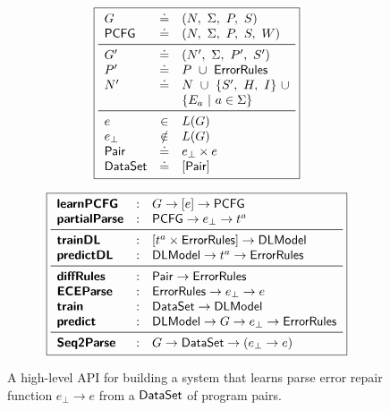 \begin{figure}[t]
\small
\begin{minipage}[t]{0.42\linewidth}
  \lstDeleteShortInline{|}
  \[
  \boxed{
  \begin{array}{lcl}
    G              & \defeq  & (N,\ \Sigma,\ P,\ S) \\
    \pcfgsym       & \defeq  & (N,\ \Sigma,\ P,\ S,\ W) \\
    \midrule
    G'             & \defeq  & (N',\ \Sigma,\ P',\ S') \\
    P'             & \defeq  & P\ \cup\ \errorrulessym \\
    N'             & \defeq  & N\ \cup\ \{S',\ H,\ I\}\ \cup\\
                   &         & \{E_a\ |\ a \in \Sigma\} \\
    \midrule
    e              & \in    & L(G) \\
    e_{\bot}       & \notin & L(G) \\
    \pairsym       & \defeq & e_{\bot} \times e \\
    \datasetsym    & \defeq & \List{\pairsym} \\
  \end{array}
  }
  \]
  \lstMakeShortInline[language=Python, mathescape=true]{|}
\end{minipage}
\begin{minipage}[t]{0.57\linewidth}
  \lstDeleteShortInline{|}
  \[
  \boxed{
  \begin{array}{lcl}
    \learnPCFGsym  & : & G \to \List{e} \to \pcfgsym \\
    \partialsym    & : & \pcfgsym \to e_{\bot} \to t^a  \\
    \midrule
    \trainDLsym    & : & \List{t^a \times \errorrulessym} \to \Model \\
    \predictDLsym  & : & \Model \to t^a \to \errorrulessym \\
    \midrule
    \diffsym       & : & \pairsym \to \errorrulessym \\
    \ecepsym       & : & \errorrulessym \to e_{\bot} \to e \\
    \trainsym      & : & \datasetsym \to \Model \\
    \predictsym    & : & \Model \to G \to e_{\bot} \to \errorrulessym \\
    \midrule
    \systemsym     & : & G \to \datasetsym \to (e_{\bot} \to e) \\
  \end{array}
  }
  \]
  \lstMakeShortInline[language=Python, mathescape=true]{|}
\end{minipage}
\caption{A high-level API for building a \toolname system that learns parse
error repair function $e_{\bot} \to e$ from a $\mathsf{DataSet}$ of program pairs.}
\label{fig:api}
\end{figure}
